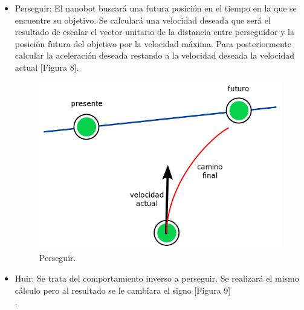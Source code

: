 \begin{itemize}
\item Perseguir: El nanobot buscará una futura posición en el tiempo en la que se encuentre su objetivo. Se calculará una velocidad deseada que será el resultado de escalar el vector unitario de la distancia entre perseguidor y la posición futura del objetivo por la velocidad máxima. Para posteriormente calcular la aceleración deseada restando a la velocidad deseada la velocidad actual [Figura 8].

 \begin{figure}[H]
 \centering
 \includegraphics[scale=0.4]{../images/pursuit.png}
 \caption{Perseguir.}
 \label{fig:../images/pursuit.png}
 \end{figure}

 \item Huir: Se trata del comportamiento inverso a perseguir. Se realizará el mismo cálculo pero al resultado se le cambiara el signo [Figura 9]\\. 



\end{itemize}
